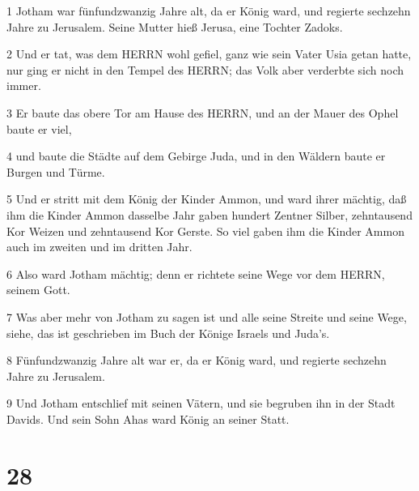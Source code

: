 \par 1 Jotham war fünfundzwanzig Jahre alt, da er König ward, und regierte sechzehn Jahre zu Jerusalem. Seine Mutter hieß Jerusa, eine Tochter Zadoks.
\par 2 Und er tat, was dem HERRN wohl gefiel, ganz wie sein Vater Usia getan hatte, nur ging er nicht in den Tempel des HERRN; das Volk aber verderbte sich noch immer.
\par 3 Er baute das obere Tor am Hause des HERRN, und an der Mauer des Ophel baute er viel,
\par 4 und baute die Städte auf dem Gebirge Juda, und in den Wäldern baute er Burgen und Türme.
\par 5 Und er stritt mit dem König der Kinder Ammon, und ward ihrer mächtig, daß ihm die Kinder Ammon dasselbe Jahr gaben hundert Zentner Silber, zehntausend Kor Weizen und zehntausend Kor Gerste. So viel gaben ihm die Kinder Ammon auch im zweiten und im dritten Jahr.
\par 6 Also ward Jotham mächtig; denn er richtete seine Wege vor dem HERRN, seinem Gott.
\par 7 Was aber mehr von Jotham zu sagen ist und alle seine Streite und seine Wege, siehe, das ist geschrieben im Buch der Könige Israels und Juda's.
\par 8 Fünfundzwanzig Jahre alt war er, da er König ward, und regierte sechzehn Jahre zu Jerusalem.
\par 9 Und Jotham entschlief mit seinen Vätern, und sie begruben ihn in der Stadt Davids. Und sein Sohn Ahas ward König an seiner Statt.

\chapter{28}

